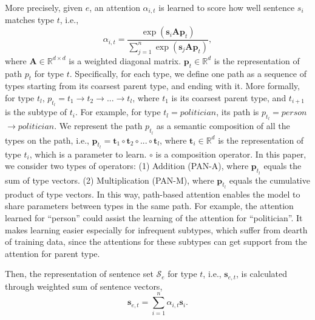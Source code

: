 \documentclass[letterpaper]{article} %
\begin{document}
More precisely, given $e$, an attention $\alpha_{i,t}$ is learned to score how well sentence $s_i$ matches type $t$, i.e., %
\[
\alpha_{i,t} = \frac{\exp(\mathbf{s}_i\mathbf{A}\mathbf{p}_t)}{\sum_{j=1}^{n} \exp(\mathbf{s}_j\mathbf{A}\mathbf{p}_t)},
\]
where $\mathbf{A} \in \mathbb{R}^{d \times d}$ is a weighted diagonal matrix.
$\mathbf{p}_t \in \mathbb{R}^{d}$ is the representation of path $p_t$ for type $t$.
Specifically, for each type, we define one path as a sequence of types starting from its coarsest parent type, and ending with it. %
More formally, for type $t_l$, $p_{t_l}=t_1$$\rightarrow$$t_2$$\rightarrow$$...$$\rightarrow$$t_l$, where $t_1$ is its coarsest parent type, and $t_{i+1}$ is the subtype of $t_{i}$.
For example, for type $t_l=politician$, its path is $p_{t_l}=person$$\rightarrow$$politician$.
We represent the path $p_{t_l}$ as a semantic composition of all the types on the path, i.e., $\mathbf{p}_{t_l}=\mathbf{t}_1 \circ \mathbf{t}_2 \circ...\circ \mathbf{t}_l$,
where $\mathbf{t}_i \in \mathbb{R}^{d}$ is the representation of type $t_i$, which is a parameter to learn. $\circ$ is a  composition operator.
In this paper, we consider two  types of operators: (1) Addition (PAN-A), where $\mathbf{p}_{t_l}$ equals the sum of type vectors. %
(2) Multiplication (PAN-M), where $\mathbf{p}_{t_l}$ equals the cumulative product of type vectors. %
In this way, path-based attention enables the model to share parameters between types in the same path. For example, the attention learned for ``person'' could assist the learning of the attention for ``politician''. It makes learning easier especially for infrequent subtypes, which suffer from dearth of training data, since the attentions for these subtypes can get support from the attention for parent type.

Then, the representation of sentence set $\mathcal{S}_e$ for type $t$, i.e., $\mathbf{s}_{e,t}$, is calculated through weighted sum of sentence vectors,
\[
\mathbf{s}_{e,t}=\sum_{i=1}^{n} \alpha_{i,t}\mathbf{s}_i. %
\]
\end{document}
